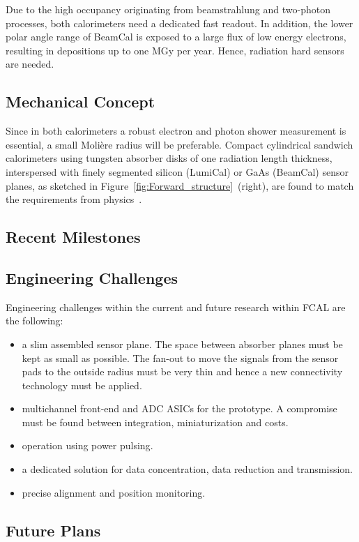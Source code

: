 Due to the high occupancy originating from beamstrahlung and two-photon processes,
both calorimeters need a dedicated fast readout.
In addition, the lower polar angle range of BeamCal is exposed to a large flux
of low energy electrons, resulting in depositions up to one
MGy per year. Hence, radiation hard sensors are needed.

\subsection{Mechanical Concept}
Since in both calorimeters a robust electron and photon shower measurement
is essential, a small Moli\`{e}re radius will be preferable.
Compact
cylindrical sandwich
calorimeters using tungsten absorber disks of one radiation length thickness, interspersed with
finely segmented silicon (LumiCal) or GaAs (BeamCal) sensor planes, as sketched in
Figure~\ref{fig:Forward_structure}~(right),
are found
to match the requirements from physics~\cite{2010JInst...512002A}.

\subsection{Recent Milestones}
\subsection{Engineering Challenges}
Engineering challenges within the current and future research within FCAL are the following:
\begin{itemize}
\item{a slim assembled sensor plane. The space between absorber planes must be kept as small
as possible. The fan-out to move the signals from the sensor pads to the outside radius must be very thin and
hence a new connectivity technology must be applied.}
\item{multichannel front-end and ADC ASICs for the prototype.
A compromise must be found between integration, miniaturization and costs}.
\item{operation using  power pulsing}.
\item{a dedicated solution for data concentration,  data reduction and transmission}.
\item{ precise alignment and position monitoring}.
\end{itemize}

\subsection{Future Plans}

